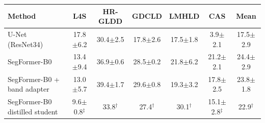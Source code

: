 \begin{tabular}{lcccccc}
\toprule
Method & L4S & HR-GLDD & GDCLD & LMHLD & CAS & Mean \\
\midrule
U-Net (ResNet34) & 17.8$\pm$6.2 & 30.4$\pm$2.5 & 17.8$\pm$2.6 & 17.5$\pm$1.8 & 3.9$\pm$2.1 & 17.5$\pm$2.9 \\
SegFormer-B0 & 13.4$\pm$9.4 & 36.9$\pm$0.6 & 28.5$\pm$0.2 & 21.8$\pm$6.2 & 21.2$\pm$2.1 & 24.4$\pm$2.9 \\
SegFormer-B0 + band adapter & 13.0$\pm$5.7 & 39.4$\pm$1.7 & 29.6$\pm$0.8 & 19.3$\pm$3.2 & 17.8$\pm$2.5 & 23.8$\pm$1.8 \\
SegFormer-B0 distilled student & 9.6$\pm$0.8$^\ddagger$ & 33.8$^\dagger$ & 27.4$^\dagger$ & 30.1$^\dagger$ & 15.1$\pm$2.8$^\ddagger$ & 22.9$^\dagger$ \\
\bottomrule
\end{tabular}
